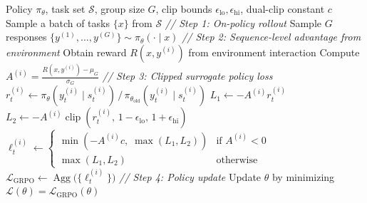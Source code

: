 \documentclass{llmxive}
\providecommand{\mycomment}[1]{\textit{// #1}}
\begin{document}
  \begin{algorithm}[t]
  \caption{GRPO}
  \label{alg:grpo}
  \begin{algorithmic}[1]
  \Require Policy $\pi_{\theta}$, task set $\mathcal{S}$, group size $G$, clip
  bounds $\epsilon_{\mathrm{lo}},\epsilon_{\mathrm{hi}}$, dual-clip constant $c$
      \State Sample a batch of tasks $\{x\}$ from $\mathcal{S}$
          \State \mycomment{Step 1: On-policy rollout}
          \State Sample $G$ responses $\{y^{(1)},\dots,y^{(G)}\} \sim \pi_{\theta}(\cdot \mid
  x)$
          \State \mycomment{Step 2: Sequence-level advantage from environment}
              \State Obtain reward $R(x, y^{(i)})$ from environment interaction
          \EndFor
          \State Compute $A^{(i)} = \frac{R(x,y^{(i)}) - \mu_G}{\sigma_G}$
          \State \mycomment{Step 3: Clipped surrogate policy loss}
                  \State $r_t^{(i)} \gets \pi_{\theta}(y_t^{(i)} \mid s_t^{(i)}) \,/\,
  \pi_{\theta_{\mathrm{old}}}(y_t^{(i)} \mid s_t^{(i)})$
                  \State $L_1 \gets -A^{(i)} r_t^{(i)}$
                  \State $L_2 \gets -A^{(i)} \operatorname{clip}(r_t^{(i)},\,
  1{-}\epsilon_{\mathrm{lo}},\, 1{+}\epsilon_{\mathrm{hi}})$
                  \State $\ell_t^{(i)} \gets \begin{cases}
  \min(-A^{(i)} c,\;\max(L_1, L_2)) & \text{if } A^{(i)} < 0 \\
  \max(L_1, L_2) & \text{otherwise}
  \end{cases}$
              \EndFor
          \EndFor
          \State $\mathcal{L}_{\mathrm{GRPO}} \gets
  \operatorname{Agg}\!\bigl(\{\ell_t^{(i)}\}\bigr)$
          \State \mycomment{Step 4: Policy update}
          \State Update $\theta$ by minimizing $\mathcal{L}(\theta) =
  \mathcal{L}_{\mathrm{GRPO}}(\theta)$
      \EndFor
  \EndFor
  \end{algorithmic}
\end{algorithm}
\end{document}
